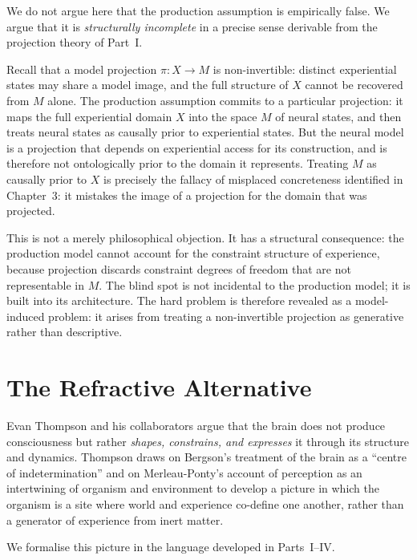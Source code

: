 \documentclass[11pt,openany]{book}
\begin{document}
We do not argue here that the production assumption is
empirically false.  We argue that it is \emph{structurally
incomplete} in a precise sense derivable from the projection
theory of Part~I.

Recall that a model projection $\pi : X \to M$ is
non-invertible: distinct experiential states may share a
model image, and the full structure of $X$ cannot be
recovered from $M$ alone.  The production assumption
commits to a particular projection: it maps the full
experiential domain $X$ into the space $M$ of neural
states, and then treats neural states as causally prior to
experiential states.  But the neural model is a projection
that depends on experiential access for its construction,
and is therefore not ontologically prior to the domain it
represents.  Treating $M$ as causally prior to $X$ is
precisely the fallacy of misplaced concreteness identified
in Chapter~3: it mistakes the image of a projection for
the domain that was projected.

This is not a merely philosophical objection.  It has a
structural consequence: the production model cannot account
for the constraint structure of experience, because
projection discards constraint degrees of freedom that are
not representable in $M$.  The blind spot is not incidental
to the production model; it is built into its architecture.
The hard problem is therefore revealed as a model-induced
problem: it arises from treating a non-invertible projection
as generative rather than descriptive.

\section{The Refractive Alternative}
\label{sec:refractive-alternative}

Evan Thompson and his collaborators \citep{thompson2023blindspot,
varela1991embodied} argue that the brain does not produce
consciousness but rather \emph{shapes, constrains, and
expresses} it through its structure and dynamics.
Thompson draws on Bergson's treatment of the brain as a
``centre of indetermination'' \citep{bergson1889time} and
on Merleau-Ponty's account of perception as an intertwining
of organism and environment \citep{merleauponty1945phenomenology}
to develop a picture in which the organism is a site where
world and experience co-define one another, rather than a
generator of experience from inert matter.

We formalise this picture in the language developed in
Parts~I--IV.
\end{document}

